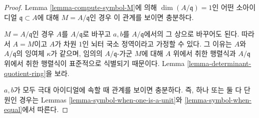 \begin{proof}
Lemma \ref{lemma-compute-symbol-M}에 의해
$\dim(A/\mathfrak q) = 1$인 어떤 소아이디얼 $\mathfrak q \subset A$에
대해 $M = A/\mathfrak q$인 경우 이 관계를 보이면 충분하다.

\medskip\noindent
$M = A/\mathfrak q$인 경우 $A$를 $A/\mathfrak q$로 바꾸고 $a, b$를
$A/\mathfrak q$에서의 그 상으로 바꾸어도 된다. 따라서 $A = M$이고
$A$가 차원 $1$인 뇌터 국소 정역이라고 가정할 수 있다. 그 이유는
$A$와 $A/\mathfrak q$의 잉여체 $\kappa$가 같으며, 임의의
$A/\mathfrak q$-가군 $M$에 대해 $A$ 위에서 취한 행렬식과
$A/\mathfrak q$ 위에서 취한 행렬식이 표준적으로 식별되기 때문이다.
Lemma \ref{lemma-determinant-quotient-ring}을 보라.

\medskip\noindent
$a, b$가 모두 극대 아이디얼에 속할 때 관계를 보이면 충분하다.
즉, 하나 또는 둘 다 단원인 경우는 Lemmas
\ref{lemma-symbol-when-one-is-a-unit}와
\ref{lemma-symbol-when-equal}에서 따른다.


\end{proof}
